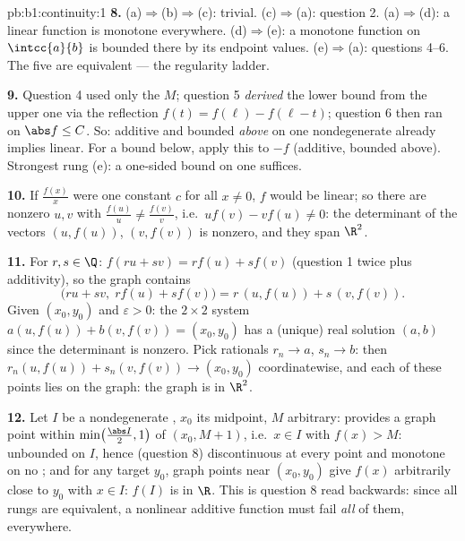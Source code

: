 \begin{solution}{pb:b1:continuity:1}
\textbf{8.} (a)$\Rightarrow$(b)$\Rightarrow$(c): trivial.
(c)$\Rightarrow$(a): question 2. (a)$\Rightarrow$(d): a linear
function is monotone everywhere. (d)$\Rightarrow$(e): a monotone
function on $\intcc{a}{b}$ is bounded there by its endpoint
values. (e)$\Rightarrow$(a): questions 4--6. The five
 are equivalent --- the regularity ladder.

\textbf{9.} Question 4 used only the  $M$; question 5
\emph{derived} the lower bound from the upper one via the
reflection $f(t) = f(\ell) - f(\ell - t)$; question 6 then ran on
$\abs f \leq C$. So: additive and bounded \emph{above} on one
nondegenerate  already implies linear. For a bound
below, apply this to $-f$ (additive, bounded above). Strongest
rung (e): a one-sided bound on one  suffices.

\textbf{10.} If $\frac{f(x)}{x}$ were one constant $c$ for all
$x \neq 0$, $f$ would be linear; so there are nonzero $u, v$
with $\frac{f(u)}u \neq \frac{f(v)}v$, i.e.\ $u f(v) - v f(u)
\neq 0$: the determinant of the vectors $(u, f(u))$, $(v,
f(v))$ is nonzero, and they span $\R^2$.

\textbf{11.} For $r, s \in \Q$: $f(ru + sv) = r f(u) + s f(v)$
(question 1 twice plus additivity), so the graph contains
\[
\bigl(ru + sv,\; r f(u) + s f(v)\bigr)
= r\,(u, f(u)) + s\,(v, f(v)) .
\]
Given $(x_0, y_0)$ and $\varepsilon > 0$: the $2 \times 2$
system $a(u, f(u)) + b(v, f(v)) = (x_0, y_0)$ has a (unique)
real solution $(a, b)$ since the determinant is nonzero. Pick
rationals $r_n \to a$, $s_n \to b$: then $r_n(u, f(u)) +
s_n(v, f(v)) \to (x_0, y_0)$ coordinatewise, and each of these
points lies on the graph: the graph is  in $\R^2$.

\textbf{12.} Let $I$ be a nondegenerate , $x_0$ its
midpoint, $M$ arbitrary:  provides a graph point within
$\min\bigl(\frac{\abs I}{2}, 1\bigr)$ of $(x_0, M + 1)$, i.e.\
$x \in I$ with $f(x) > M$: unbounded on $I$, hence (question 8)
discontinuous at every point and monotone on no ; and
for any target $y_0$, graph points near $(x_0, y_0)$ give $f(x)$
arbitrarily close to $y_0$ with $x \in I$: $f(I)$ is  in
$\R$. This is question 8 read backwards: since all rungs are
equivalent, a nonlinear additive function must fail \emph{all}
of them, everywhere.


\end{solution}
